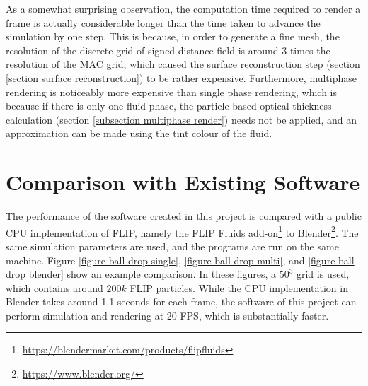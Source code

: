 As a somewhat surprising observation, the computation time required to render a frame is actually considerable longer than the time taken to advance the simulation by one step. This is because, in order to generate a fine mesh, the resolution of the discrete grid of signed distance field is around 3 times the resolution of the MAC grid, which caused the surface reconstruction step (section \ref{section surface reconstruction}) to be rather expensive. Furthermore, multiphase rendering is noticeably more expensive than single phase rendering, which is because if there is only one fluid phase, the particle-based optical thickness calculation (section \ref{subsection multiphase render}) needs not be applied, and an approximation can be made using the tint colour of the fluid.

\section{Comparison with Existing Software}

The performance of the software created in this project is compared with a public CPU implementation of FLIP, namely the FLIP Fluids add-on\footnote{\url{https://blendermarket.com/products/flipfluids}} to Blender\footnote{\url{https://www.blender.org/}}. The same simulation parameters are used, and the programs are run on the same machine. Figure \ref{figure ball drop single}, \ref{figure ball drop multi}, and \ref{figure ball drop blender} show an example comparison. In these figures, a $50^3$ grid is used, which contains around $200k$ FLIP particles. While the CPU implementation in Blender takes around 1.1 seconds for each frame, the software of this project can perform simulation and rendering at $20$ FPS, which is substantially faster.

\gapM
\gapM
\gapM

